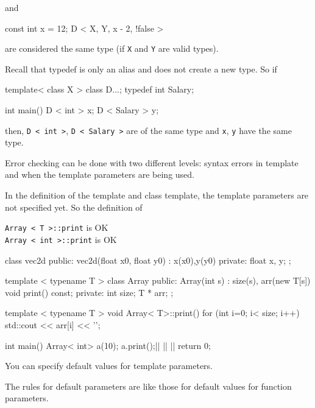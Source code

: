 and

\begin{console}
const int x = 12;
D < X, Y, x - 2, !false > 
\end{console}

are considered the same type (if \texttt{X} and \texttt{Y} are valid types).

Recall that typedef is only an alias and does not create a new type. So if

\begin{console}
template< class X >
class D{...};
typedef int Salary;

int main()
{    
     D < int > x;       
     D < Salary > y;
}
\end{console}

then, \texttt{D < int >}, \texttt{D < Salary >} are of the same type and \texttt{x}, \texttt{y} have the same type.

Error checking can be done with two different levels: syntax errors in template and when the template parameters are being used.

In the definition of the template and class template, the template parameters are not specified yet. So the definition of

\texttt{Array < T >::print} is OK\\
\texttt{Array < int >::print} is OK\\

\begin{consolethree}[escapeinside=||]
class vec2d
{
public:
     vec2d(float x0, float y0)
         : x(x0),y(y0)
     {}
private:
     float x, y;
};

template < typename T >
class Array {
public:
     Array(int s)
         : size(s), arr(new T[s])
     {}
     void print() const;
private:
     int size; T * arr;
};

template < typename T >
void Array< T>::print()
{    
     for (int i=0; i< size; i++)
     std::cout << arr[i] << '\n';
}

int main()
{    
     Array< int> a(10); a.print();||
     ||
     ||
     return 0;
}
 
\end{consolethree}

You can specify default values for template parameters.

The rules for default parameters are like those for default values for
function parameters.

